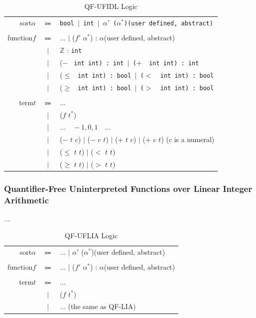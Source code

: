\documentclass[10pt,letter]{article}
\theoremstyle{definition}
\begin{document}
\begin{table}[!h]
\begin{mdframed}
\centering
\begin{tabular}{r c l}
sort\qquad $\alpha$ & $\Coloneqq$ & \tt bool $\mid$ int $\mid$ $\alpha'$ \rm($\alpha^*$)\qquad(user defined, abstract)\\
\\
function\qquad $f$ & $\Coloneqq$ & $\ldots$ $\mid$ \rm ($f'$ $\alpha^*$) : $\alpha$\qquad(user defined, abstract)\\
& $\mid$ & $\mathbb{Z}$ \rm : \tt int\\
& $\mid$ & ($-$ \tt\ int int\rm) : \tt int $\mid$ \rm($+$ \tt\ int int\rm) : \tt int\\
& $\mid$ & ($\leqslant$ \tt\ int int\rm) : \tt bool $\mid$ \rm($<$ \tt\ int int\rm) : \tt bool\\
& $\mid$ & ($\geqslant$ \tt\ int int\rm) : \tt bool $\mid$ \rm($>$ \tt\ int int\rm) : \tt bool\\
\\
term\qquad $t$ & $\Coloneqq$ & $\ldots$ \\
& $\mid$ & ($f$ $t^*$)\\
& $\mid$ & $\ldots\quad-1,0,1\quad\ldots$\\
& $\mid$ & ($-$ $t$ $c$) $\mid$ ($-$ $c$ $t$) $\mid$ ($+$ $t$ $c$) $\mid$ ($+$ $c$ $t$) \qquad($c$ is a numeral)\\
& $\mid$ & ($\leqslant$ $t$ $t$) $\mid$ ($<$ $t$ $t$)\\
& $\mid$ & ($\geqslant$ $t$ $t$) $\mid$ ($>$ $t$ $t$)\\
\end{tabular}
\end{mdframed}
\caption{QF-UFIDL Logic}
\end{table}

\subsubsection{Quantifier-Free Uninterpreted Functions over Linear Integer Arithmetic}
...

\begin{table}[!h]
\begin{mdframed}
\centering
\begin{tabular}{r c l}
sort\qquad $\alpha$ & $\Coloneqq$ & $\ldots$ $\mid$ $\alpha'$ ($\alpha^*$)\rm\qquad(user defined, abstract)\\
\\
function\qquad $f$ & $\Coloneqq$ & $\ldots$ $\mid$ \rm ($f'$ $\alpha^*$) : $\alpha$\qquad(user defined, abstract)\\
\\
term\qquad $t$ & $\Coloneqq$ & $\ldots$ \\
& $\mid$ & ($f$ $t^*$)\\
& $\mid$ & $\ldots$ \qquad(\rm the same as QF-LIA)\\
\end{tabular}
\end{mdframed}
\caption{QF-UFLIA Logic}
\end{table}
\end{document}
